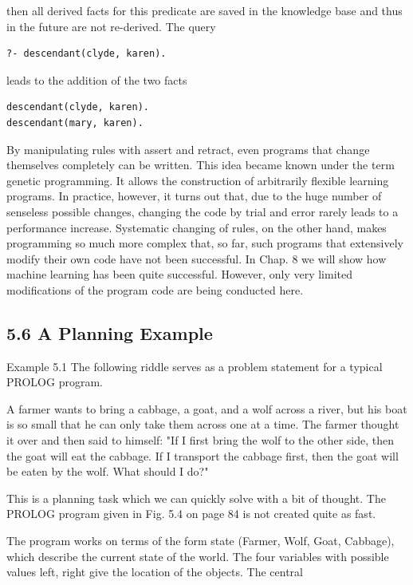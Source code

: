 \documentclass[10pt]{book}
\begin{document}
\begin{center}
then all derived facts for this predicate are saved in the knowledge base and thus in the future are not re-derived. The query

\begin{verbatim}
?- descendant(clyde, karen).
\end{verbatim}

leads to the addition of the two facts

\begin{verbatim}
descendant(clyde, karen).
descendant(mary, karen).
\end{verbatim}

By manipulating rules with assert and retract, even programs that change themselves completely can be written. This idea became known under the term genetic programming. It allows the construction of arbitrarily flexible learning programs. In practice, however, it turns out that, due to the huge number of senseless possible changes, changing the code by trial and error rarely leads to a performance increase. Systematic changing of rules, on the other hand, makes programming so much more complex that, so far, such programs that extensively modify their own code have not been successful. In Chap. 8 we will show how machine learning has been quite successful. However, only very limited modifications of the program code are being conducted here.

\subsection*{5.6 A Planning Example}
Example 5.1 The following riddle serves as a problem statement for a typical PROLOG program.

A farmer wants to bring a cabbage, a goat, and a wolf across a river, but his boat is so small that he can only take them across one at a time. The farmer thought it over and then said to himself: "If I first bring the wolf to the other side, then the goat will eat the cabbage. If I transport the cabbage first, then the goat will be eaten by the wolf. What should I do?"

This is a planning task which we can quickly solve with a bit of thought. The PROLOG program given in Fig. 5.4 on page 84 is not created quite as fast.

The program works on terms of the form state (Farmer, Wolf, Goat, Cabbage), which describe the current state of the world. The four variables with possible values left, right give the location of the objects. The central


\end{center}
\end{document}
